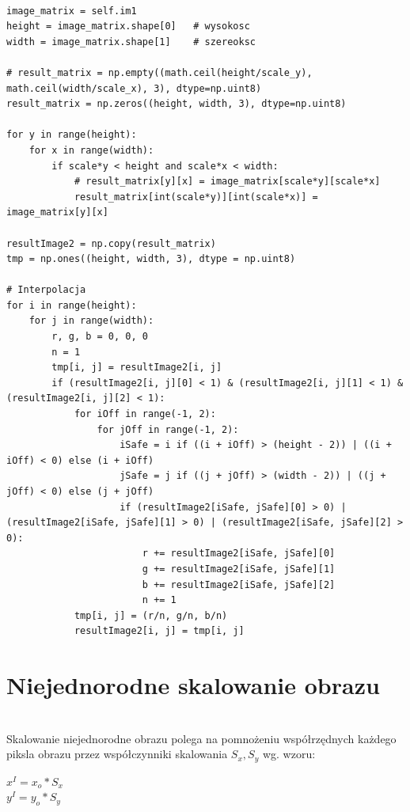 \documentclass[final,a4paper,openany,12pt]{mwbk}
\begin{document}
\begin{lstlisting}[caption= Jednorodne skalowanie obrazu]

image_matrix = self.im1
height = image_matrix.shape[0]   # wysokosc
width = image_matrix.shape[1]    # szereoksc

# result_matrix = np.empty((math.ceil(height/scale_y), math.ceil(width/scale_x), 3), dtype=np.uint8)
result_matrix = np.zeros((height, width, 3), dtype=np.uint8)

for y in range(height):
    for x in range(width): 
        if scale*y < height and scale*x < width:
            # result_matrix[y][x] = image_matrix[scale*y][scale*x]
            result_matrix[int(scale*y)][int(scale*x)] = image_matrix[y][x]

resultImage2 = np.copy(result_matrix)
tmp = np.ones((height, width, 3), dtype = np.uint8)

# Interpolacja
for i in range(height):
    for j in range(width):
        r, g, b = 0, 0, 0
        n = 1
        tmp[i, j] = resultImage2[i, j]
        if (resultImage2[i, j][0] < 1) & (resultImage2[i, j][1] < 1) & (resultImage2[i, j][2] < 1):
            for iOff in range(-1, 2):
                for jOff in range(-1, 2):
                    iSafe = i if ((i + iOff) > (height - 2)) | ((i + iOff) < 0) else (i + iOff)
                    jSafe = j if ((j + jOff) > (width - 2)) | ((j + jOff) < 0) else (j + jOff)
                    if (resultImage2[iSafe, jSafe][0] > 0) | (resultImage2[iSafe, jSafe][1] > 0) | (resultImage2[iSafe, jSafe][2] > 0):
                        r += resultImage2[iSafe, jSafe][0]
                        g += resultImage2[iSafe, jSafe][1]
                        b += resultImage2[iSafe, jSafe][2]
                        n += 1
            tmp[i, j] = (r/n, g/n, b/n)
            resultImage2[i, j] = tmp[i, j]

\end{lstlisting}

\section{ Niejednorodne skalowanie obrazu}
\hfill\\
\indent
Skalowanie niejednorodne obrazu polega na pomnożeniu współrzędnych każdego piksla obrazu przez współczynniki skalowania $S_{x}, S_{y}$ wg. wzoru:

\begin{center}
	$x^I = x_{o} * S_{x}$ \\
	$y^I = y_{o} * S_{y}$
\end{center}
\end{document}
